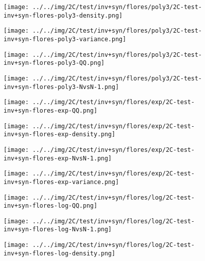 \begin{figure}[H]
\centering	\texttt{[image: ../../img/2C/test/inv+syn/flores/poly3/2C-test-inv+syn-flores-poly3-density.png]}
\end{figure}
\begin{figure}[H]
\centering	\texttt{[image: ../../img/2C/test/inv+syn/flores/poly3/2C-test-inv+syn-flores-poly3-variance.png]}
\end{figure}
\begin{figure}[H]
\centering	\texttt{[image: ../../img/2C/test/inv+syn/flores/poly3/2C-test-inv+syn-flores-poly3-QQ.png]}
\end{figure}
\begin{figure}[H]
\centering	\texttt{[image: ../../img/2C/test/inv+syn/flores/poly3/2C-test-inv+syn-flores-poly3-NvsN-1.png]}
\end{figure}
\begin{figure}[H]
\centering	\texttt{[image: ../../img/2C/test/inv+syn/flores/exp/2C-test-inv+syn-flores-exp-QQ.png]}
\end{figure}
\begin{figure}[H]
\centering	\texttt{[image: ../../img/2C/test/inv+syn/flores/exp/2C-test-inv+syn-flores-exp-density.png]}
\end{figure}
\begin{figure}[H]
\centering	\texttt{[image: ../../img/2C/test/inv+syn/flores/exp/2C-test-inv+syn-flores-exp-NvsN-1.png]}
\end{figure}
\begin{figure}[H]
\centering	\texttt{[image: ../../img/2C/test/inv+syn/flores/exp/2C-test-inv+syn-flores-exp-variance.png]}
\end{figure}
\begin{figure}[H]
\centering	\texttt{[image: ../../img/2C/test/inv+syn/flores/log/2C-test-inv+syn-flores-log-QQ.png]}
\end{figure}
\begin{figure}[H]
\centering	\texttt{[image: ../../img/2C/test/inv+syn/flores/log/2C-test-inv+syn-flores-log-NvsN-1.png]}
\end{figure}
\begin{figure}[H]
\centering	\texttt{[image: ../../img/2C/test/inv+syn/flores/log/2C-test-inv+syn-flores-log-density.png]}
\end{figure}
